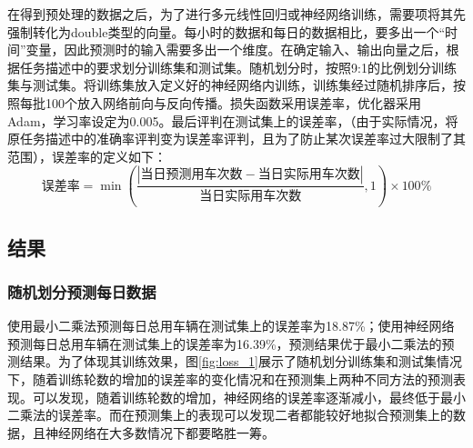 \documentclass[CJK]{ctexart}
\begin{document}
在得到预处理的数据之后，为了进行多元线性回归或神经网络训练，需要项将其先强制转化为double类型的向量。每小时的数据和每日的数据相比，要多出一个“时间”变量，因此预测时的输入需要多出一个维度。在确定输入、输出向量之后，根据任务描述中的要求划分训练集和测试集。随机划分时，按照9:1的比例划分训练集与测试集。将训练集放入定义好的神经网络内训练，训练集经过随机排序后，按照每批100个放入网络前向与反向传播。损失函数采用误差率，优化器采用Adam，学习率设定为0.005。最后评判在测试集上的误差率，（由于实际情况，将原任务描述中的准确率评判变为误差率评判，且为了防止某次误差率过大限制了其范围），误差率的定义如下：
$$\mbox{误差率}=\min(\frac{|\mbox{当日预测用车次数}-\mbox{当日实际用车次数}|}{\mbox{当日实际用车次数}},1)\times 100\%$$
\subsection{结果}
\subsubsection{随机划分预测每日数据}
使用最小二乘法预测每日总用车辆在测试集上的误差率为18.87\%；使用神经网络预测每日总用车辆在测试集上的误差率为16.39\%，预测结果优于最小二乘法的预测结果。为了体现其训练效果，图\ref{fig:loss_1}展示了随机划分训练集和测试集情况下，随着训练轮数的增加的误差率的变化情况和在预测集上两种不同方法的预测表现。可以发现，随着训练轮数的增加，神经网络的误差率逐渐减小，最终低于最小二乘法的误差率。而在预测集上的表现可以发现二者都能较好地拟合预测集上的数据，且神经网络在大多数情况下都要略胜一筹。
\end{document}
